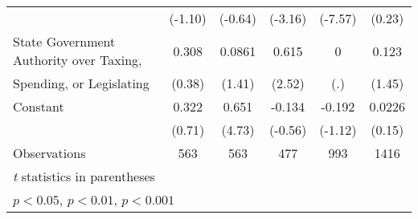 {\begin{tabular}{l*{5}{c}}
                                        &  (-1.10)         &  (-0.64)         &  (-3.16)         &  (-7.57)         &   (0.23)         \\
\addlinespace
State Government Authority over Taxing, &    0.308         &   0.0861         &    0.615\sym{*}  &        0         &    0.123         \\
Spending, or Legislating                &   (0.38)         &   (1.41)         &   (2.52)         &      (.)         &   (1.45)         \\
\addlinespace
Constant                                &    0.322         &    0.651\sym{***}&   -0.134         &   -0.192         &   0.0226         \\
                                        &   (0.71)         &   (4.73)         &  (-0.56)         &  (-1.12)         &   (0.15)         \\
\midrule
Observations                            &      563         &      563         &      477         &      993         &     1416         \\
\bottomrule
\multicolumn{6}{l}{\footnotesize \textit{t} statistics in parentheses}\\
\multicolumn{6}{l}{\footnotesize \sym{*} \(p<0.05\), \sym{**} \(p<0.01\), \sym{***} \(p<0.001\)}\\
\end{tabular}
}
